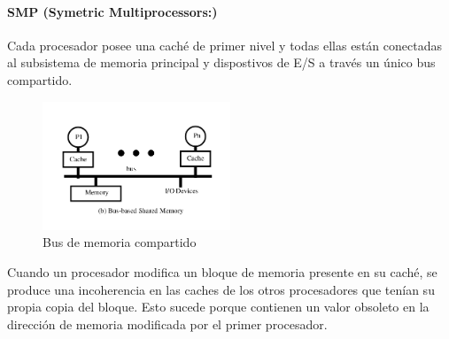 \paragraph{SMP (Symetric Multiprocessors:)} Cada procesador posee una caché de primer nivel y todas ellas están conectadas al subsistema de memoria principal y dispostivos de E/S a través un único bus compartido.

\begin{figure}[ht]
	\centering
	\includegraphics[width=0.5\textwidth]{imagenes/multiprocesor-caches}
	\caption{Bus de memoria compartido}
	\label{fig:busCompartido}
\end{figure}

Cuando un procesador modifica un bloque de memoria presente en su caché, se produce una incoherencia en las caches de los otros procesadores que tenían su propia copia del bloque. Esto sucede porque contienen un valor obsoleto en la dirección de memoria modificada por el primer procesador.

%

